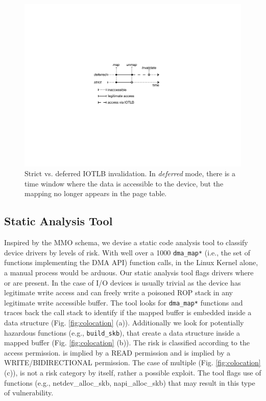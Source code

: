 \begin{figure}[t]
    \centering
    \includegraphics[width=1\columnwidth]{figs/strict.pdf}
    \caption{Strict vs. deferred IOTLB invalidation. In \emph{deferred} mode, there is a time window where the data is accessible to the device, but the mapping no longer appears in the page table.}
    \label{fig:deferred}
\end{figure}
\subsection{Static Analysis Tool}

Inspired by the MMO schema, we devise a static code analysis tool to classify device drivers by levels of risk. With well over a 1000 \texttt{dma\_map*} (i.e., the set of functions implementing the DMA API) function calls, in the Linux Kernel alone, a manual process would be arduous. Our static analysis tool flags drivers where \means{} or \oportunity{} are present. In the case of I/O devices \motivation{} is usually trivial as the device has legitimate write access and can freely write a poisoned ROP stack in any legitimate write accessible buffer. The tool looks for \texttt{dma\_map*} functions and traces back the call stack to identify if the mapped buffer is embedded inside a data structure (Fig. \ref{fig:colocation} (a)). Additionally we look for potentially hazardous functions (e.g., \texttt{build\_skb}), that create a data structure inside a mapped buffer (Fig. \ref{fig:colocation} (b)). The risk is classified according to the access permission. \means{} is implied by a READ permission and \oportunity{} is implied by a WRITE/BIDIRECTIONAL permission. The case of multiple \iova{} (Fig. \ref{fig:colocation} (c)), is not a risk category by itself, rather a possible exploit. The tool flags use of functions (e.g., netdev\_alloc\_skb, napi\_alloc\_skb) that may result in this type of vulnerability. 

